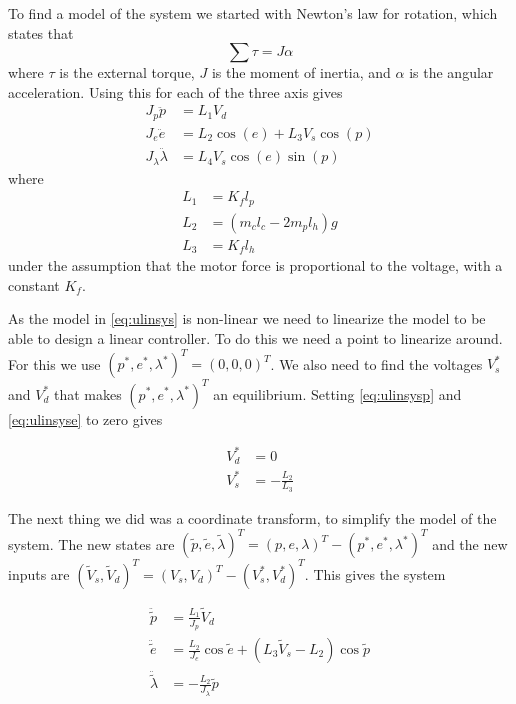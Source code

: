 To find a model of the system we started with Newton's  law for rotation, which states that
\begin{equation} \label{eq:N2rot}
\sum \tau = J \alpha
\end{equation}
where $\tau$ is the external torque, $J$ is the moment of inertia, and $\alpha$ is the angular acceleration. Using this for each of the three axis gives
\begin{subequations}
  \begin{align}
    J_p\ddot{p} &= L_{1}V_{d} \label{eq:ulinsysp}\\
    J_e\ddot{e} &= L_{2} \cos(e) + L_3 V_s \cos(p) \label{eq:ulinsyse}\\
    J_\lambda \ddot{\lambda} &= L_4 V_s \cos(e) \sin(p) \label{eq:ulinsysl}
  \end{align}
  \label{eq:ulinsys}
\end{subequations}
where 
\begin{subequations}
	\begin{align*}
		L_1 &= K_f l_p\\
		L_2 &= (m_c l_c - 2 m_p l_h)g\\
		L_3 &= K_f l_h
	\end{align*}
\end{subequations}
under the assumption that the motor force is proportional to the voltage, with a constant $K_f$.

As the model in \cref{eq:ulinsys} is non-linear we need to linearize the model to be able to design a linear controller. To do this we need a point to linearize around. For this we use $(p^*, e^*, \lambda^*)^T = (0, 0, 0)^T$. We also need to find the voltages $V_s^*$ and $V_d^*$ that makes $(p^*, e^*, \lambda^*)^T$ an equilibrium. Setting \cref{eq:ulinsysp} and \cref{eq:ulinsyse} to zero gives

\begin{subequations}
	\begin{align*}
		V_d^* &= 0\\
		V_s^* &= -\frac{L_2}{L_3}
	\end{align*}
\end{subequations}

The next thing we did was a coordinate transform, to simplify the model of the system. The new states are $ (\tilde p, \tilde e, \tilde \lambda)^T = (p, e, \lambda)^T - (p^*, e^*, \lambda^*)^T $ and the new inputs are $(\tilde V_s, \tilde V_d)^T = (V_s, V_d)^T - (V_s^*, V_d^*)^T $. This gives the system

\begin{subequations}
	\begin{align}
		\ddot{\tilde p} &= \frac{L_1}{J_p} \tilde V_d\\
		\ddot{\tilde e} &= \frac{L_2}{J_e} \cos \tilde e + (L_3 \tilde V_s - L_2) \cos \tilde p\\
		\ddot{\tilde \lambda} &= -\frac{L_2}{J_{\lambda}} \tilde p
	\end{align}
	\label{eq:transformertulinsys}
\end{subequations}


